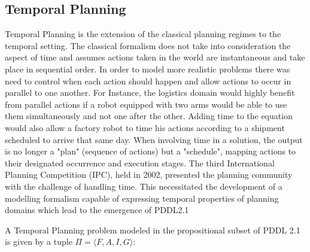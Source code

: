 \subsection{Temporal Planning}
\label{background: Temporal}
Temporal Planning is the extension of the classical planning regimes to the temporal setting. The classical formalism does not take into consideration the aspect of time and assumes actions taken in the world are instantaneous and take place in sequential order. In order to model more realistic problems there was need to control when each action should happen and allow actions to occur in parallel to one another. For Instance, the logistics domain would highly benefit from parallel actions if a robot equipped with two arms would be able to use them simultaneously and not one after the other. Adding time to the equation would also allow a factory robot to time his actions according to a shipment scheduled to arrive that same day. When involving time in a solution, the output is no longer a "plan" (sequence of actions) but a "schedule", mapping actions to their designated occurrence and execution stages.
The third International Planning Competition (IPC), held in 2002, presented the planning community with the challenge of handling time. This necessitated the development of a modelling formalism capable of expressing temporal properties of planning domains which lead to the emergence of PDDL2.1

A Temporal Planning problem modeled in the propositional subset of PDDL 2.1 \cite{fox2003pddl2} is given by a tuple $\Pi = \langle F,A,I,G \rangle$:

